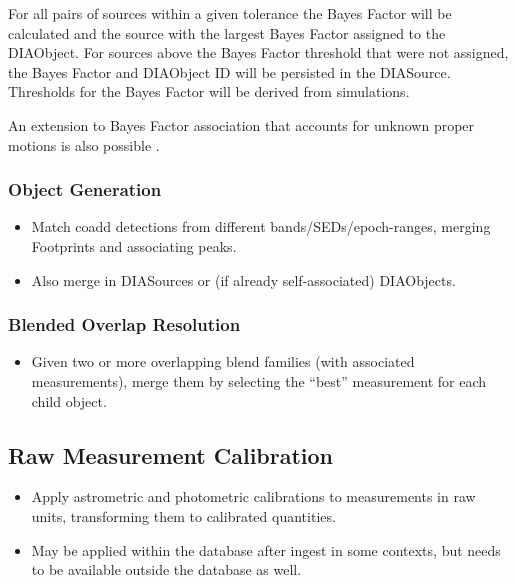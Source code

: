 For all pairs of sources within a given tolerance the Bayes Factor
will be calculated and the source with the largest Bayes Factor
assigned to the DIAObject. For sources above the Bayes Factor
threshold that were not assigned, the Bayes Factor and DIAObject ID
will be persisted in the DIASource. Thresholds for the Bayes Factor
will be derived from simulations.

An extension to Bayes Factor association that accounts for unknown
proper motions is also possible \citep{2010ApJ...719...59K}.


\subsubsection{Object Generation}
\label{sec:acObjectGeneration}
\begin{itemize}
\item Match coadd detections from different bands/SEDs/epoch-ranges, merging Footprints and associating peaks.
\item Also merge in DIASources or (if already self-associated) DIAObjects.
\end{itemize}

\subsubsection{Blended Overlap Resolution}
\label{sec:acBlendedOverlapResolution}
\begin{itemize}
\item Given two or more overlapping blend families (with associated measurements), merge them by selecting the ``best'' measurement for each child object.
\end{itemize}

\subsection{Raw Measurement Calibration}
\label{sec:acRawMeasurementCalibration}

\begin{itemize}
\item Apply astrometric and photometric calibrations to measurements in raw units, transforming them to calibrated quantities.
\item May be applied within the database after ingest in some contexts, but needs to be available outside the database as well.
\end{itemize}


